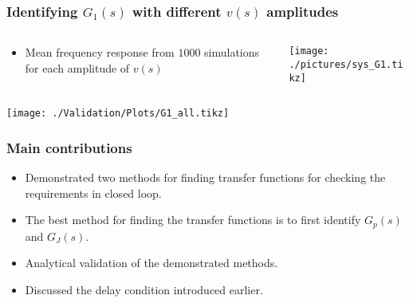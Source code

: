 \begin{frame}
		\frametitle{Identifying $G_1(s)$ with different $v(s)$ amplitudes}
	\begin{columns}
		\begin{column}{0.3\textwidth}
			\begin{itemize}
				\item Mean frequency response from $1000$ simulations for each amplitude of $v(s)$
			\end{itemize}
		\end{column}
		\begin{column}{0.7\textwidth}
			\texttt{[image: ./pictures/sys\_G1.tikz]}
		\end{column}
	\end{columns}
	\texttt{[image: ./Validation/Plots/G1\_all.tikz]}
\end{frame}
\begin{frame}
	\frametitle{Main contributions}
	\begin{itemize}
		\item Demonstrated two methods for finding transfer functions for checking the requirements in closed loop.
		\item The best method for finding the transfer functions is to first identify $G_p(s)$ and $G_J(s)$.
		\item Analytical validation of the demonstrated methods.
		\item Discussed the delay condition introduced earlier.
	\end{itemize}
\end{frame}


